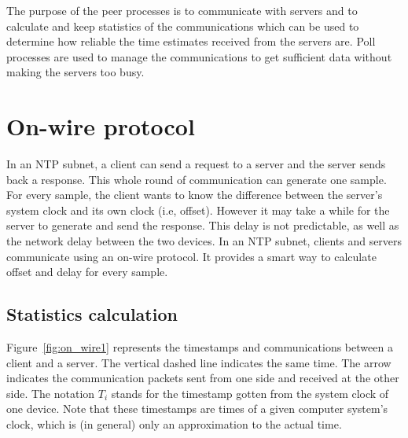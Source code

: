 

The purpose of the peer processes is to communicate with servers and to
calculate and keep statistics of the communications which can be used to
determine how reliable the time estimates received from the servers are. Poll
processes are used to manage the communications to get sufficient data without
making the servers too busy.

\section{On-wire protocol}%
\label{sec:on_wire_protocol}
In an NTP subnet, a client can send a request to a server and the server sends
back a response. This whole round of communication can generate one sample. For
every sample, the client wants to know the difference between the server's
system clock and its own clock (i.e, offset).  However it may take a while for
the server to generate and send the response. This delay is not predictable, as
well as the network delay between the two devices. In an NTP subnet, clients
and servers communicate using an on-wire protocol. It provides a smart way to
calculate offset and delay for every sample. 

\subsection{Statistics calculation}%
\label{sub:statistics_calculation}
Figure~\ref{fig:on_wire1} represents the timestamps and communications between
a client and a server. The vertical dashed line indicates the same time. The
arrow indicates the communication packets sent from one side and received at
the other side. The notation $T_i$ stands for the timestamp gotten from the
system clock of one device. Note that these timestamps are times of a given
computer system's clock, which is (in general) only an approximation to the
actual time.



